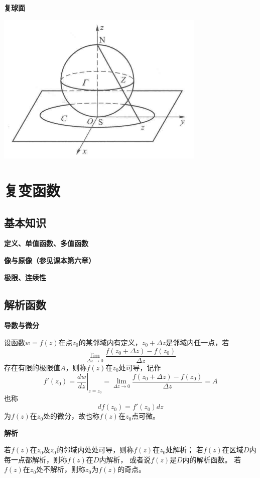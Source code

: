 \documentclass[a4paper,12pt]{article}
\begin{document}
\noindent
\textbf{复球面}

\begin{center}
    \includegraphics[width=10cm]{复球面.png}
\end{center}

\section{复变函数}

\subsection{基本知识}

\noindent
\textbf{定义、单值函数、多值函数}

\noindent
\textbf{像与原像（参见课本第六章）}

\noindent
\textbf{极限、连续性}

\subsection{解析函数}

\noindent
\textbf{导数与微分}

设函数$w=f\left(z\right)$在点$z_0$的某邻域内有定义，$z_0+\Delta z$是邻域内任一点，若
$$
\lim_{\Delta z\to0}\frac{f\left(z_0+\Delta z\right)-f\left(z_0\right)}{\Delta z}
$$
存在有限的极限值$A$，则称$f\left(z\right)$在$z_0$处可导，记作
$$
f'\left(z_0\right)=\left.\frac{dw}{dz}\right|_{z=z_0}=
\lim_{\Delta z\to0}\frac{f\left(z_0+\Delta z\right)-f\left(z_0\right)}{\Delta z}=A
$$
也称
$$
df\left(z_0\right)=f'\left(z_0\right)dz
$$
为$f\left(z\right)$在$z_0$处的微分，故也称$f\left(z\right)$在$z_0$点可微。

\noindent
\textbf{解析}

若$f\left(z\right)$在$z_0$及$z_0$的邻域内处处可导，则称$f\left(z\right)$在$z_0$处解析；
若$f\left(z\right)$在区域$D$内每一点都解析，则称$f\left(z\right)$在$D$内解析，
或者说$f\left(z\right)$是$D$内的解析函数。
若$f\left(z\right)$在$z_0$处不解析，则称$z_0$为$f\left(z\right)$的奇点。
\end{document}
